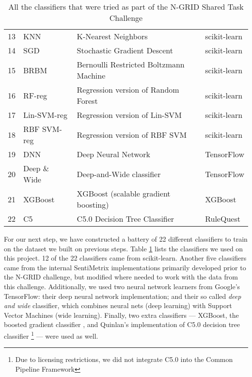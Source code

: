 \begin{table}[t]
{\begin{tabular}{|l|l|l|l|}
    13 &  \textsf{KNN} & \textsf{K-Nearest Neighbors \cite{scikit-learn}} & \textsf{scikit-learn} \\
    14 & \textsf{SGD} & \textsf{Stochastic Gradient Descent \cite{scikit-learn}}& \textsf{scikit-learn} \\
    15 & \textsf{BRBM} & \textsf{Bernoulli Restricted Boltzmann Machine \cite{scikit-learn}} & \textsf{scikit-learn}\\
    16 & \textsf{RF-reg} & \textsf{Regression version of Random Forest \cite{ho95}}& \textsf{scikit-learn}\\
    17 & \textsf{Lin-SVM-reg} & \textsf{Regression version of Lin-SVM \cite{cortes95}}& \textsf{scikit-learn}\\
    18 & \textsf{RBF SVM-reg} & \textsf{Regression version of RBF SVM \cite{cortes95}}& \textsf{scikit-learn}\\
    \hline
    19 & \textsf{DNN} & \textsf{Deep Neural Network \cite{tensorflow}}& \textsf{TensorFlow} \\
    20 & \textsf{Deep \& Wide} & \textsf{Deep-and-Wide classifier \cite{tensorflow}}& \textsf{TensorFlow} \\
    \hline
    21 & \textsf{XGBoost}& \textsf{XGBoost (scalable gradient boosting) \cite{xgboost}}& \textsf{XGBoost} \\
    22 & \textsf{C5} & \textsf{C5.0 Decision Tree Classifier \cite{c5}} & \textsf{RuleQuest} \\
    \hline
    \end{tabular}
    \caption{All the classifiers that were tried as part of the N-GRID Shared Task Challenge}
    \label{tab:Classifiers}
}
\end{table}


For our next step, we have constructed a battery of 22 different classifiers
to train on the dataset we built on previous steps. 
Table \ref{tab:Classifiers} lists the classifiers we
used on this project. 12 of the 22 classifiers came from \textsf{scikit-learn}.
Another five classifiers came from the internal SentiMetrix implementations
primarily developed prior to the N-GRID challenge, but modified where needed
to work with the data from this challenge.  Additionally, we used two 
neural network learners from Google's \textsf{TensorFlow}: their deep neural network
implementation; and their so called \textit{deep and wide} classifier, which
combines neural nets (deep learning) with Support Vector Machines (wide learning).
Finally, two extra classifiers --- \textsf{XGBoost}, the boosted gradient classifier
\cite{xgboost}, and Quinlan's implementation of
C5.0 decision tree classifier \footnote{Due to licensing restrictions, we did not integrate C5.0 into the Common Pipeline Framework} \cite{c5} --- were used as well.

